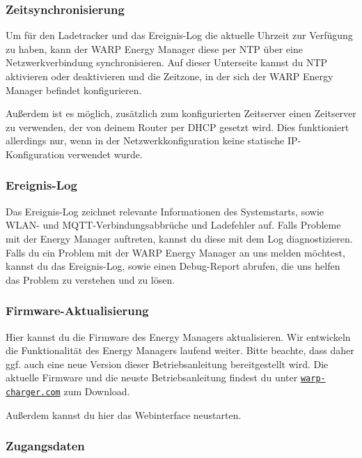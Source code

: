 \documentclass[a4paper,10pt]{article}
\newcommand{\gfx}[1]{\texttt{[image: \#1]}}
\newcommand\rurl[2]{%
  \href{#1}{\nolinkurl{#2}}%
}
\begin{document}
\begin{multicols*}{2}
	\subsubsection{Zeitsynchronisierung}\label{ntp}
	Um für den Ladetracker und das Ereignis-Log die aktuelle Uhrzeit zur
	Verfügung zu haben, kann der WARP Energy Manager diese per NTP über
	eine Netzwerkverbindung synchronisieren. Auf dieser Unterseite kannst du NTP aktivieren oder deaktivieren und die Zeitzone, in der sich
	der WARP Energy Manager befindet konfigurieren.

	Außerdem ist es möglich, zusätzlich zum konfigurierten Zeitserver einen Zeitserver zu verwenden, der von deinem Router per DHCP gesetzt wird. Dies funktioniert allerdings nur,
	wenn in der Netzwerkkonfiguration keine statische IP-Konfiguration verwendet wurde.


	\subsubsection{Ereignis-Log}

	\newpage

	Das Ereignis-Log zeichnet relevante Informationen des Systemstarts, sowie WLAN- und MQTT-Verbindungsabbrüche und Ladefehler auf.
	Falls Probleme mit der Energy Manager auftreten, kannst du diese mit dem Log diagnostizieren.
	Falls du ein Problem mit der WARP Energy Manager an uns melden möchtest, kannst du das Ereignis-Log,
	sowie einen Debug-Report abrufen, die uns helfen das Problem zu verstehen und zu lösen.

	\subsubsection{Firmware-Aktualisierung}\label{firmware-update}
	Hier kannst du die Firmware des Energy Managers aktualisieren. Wir entwickeln die Funktionalität
	des Energy Managers laufend weiter. Bitte beachte, dass daher ggf. auch eine neue
	Version dieser Betriebsanleitung bereitgestellt wird.
	Die aktuelle Firmware und die neuste Betriebsanleitung findest du unter
	\rurl{https://warp-charger.com}{warp-charger.com} zum Download.

	Außerdem kannst du hier das Webinterface neustarten.


	\subsubsection{Zugangsdaten}\label{zugangsdaten}

\end{multicols*}
\end{document}
